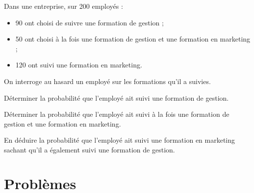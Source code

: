 \documentclass[11pt]{article}
\begin{document}
\begin{exercice}
Dans une entreprise, sur 200 employés :
\begin{itemize}
    \item 90 ont choisi de suivre une formation de gestion ;
    \item 50 ont choisi à la fois une formation de gestion et une formation en marketing ;
    \item 120 ont suivi une formation en marketing.
\end{itemize}

On interroge au hasard un employé sur les formations qu'il a suivies.

\begin{enu}
\item Déterminer la probabilité que l'employé ait suivi une formation de gestion.
\item Déterminer la probabilité que l'employé ait suivi à la fois une formation de gestion et une formation en marketing.
\item En déduire la probabilité que l'employé ait suivi une formation en marketing sachant qu'il a également suivi une formation de gestion.
\end{enu}
\end{exercice}


\section{Problèmes}
\end{document}
